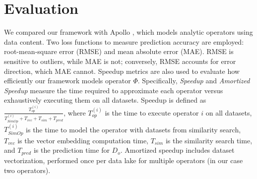 \section{Evaluation}

We compared our framework with Apollo \cite{b7Apollo1, b7Apollo2}, which models analytic operators using data content. Two loss functions to measure prediction accuracy are employed: root-mean-square error (RMSE) and mean absolute error (MAE). RMSE is sensitive to outliers, while MAE is not; conversely, RMSE accounts for error direction, which MAE cannot. Speedup metrics are also used to evaluate how efficiently our framework models operator $\Phi$. Specifically, \textit{Speedup} and \textit{Amortized Speedup} measure the time required to approximate each operator versus exhaustively executing them on all datasets. Speedup is defined as $\frac{T{^{(i)}_{op}}}{T{^{(i)}_{SimOp} + T_{vec} + T_{sim} + T_{pred}}}$, where $T{^{(i)}_{op}}$ is the time to execute operator $i$ on all datasets, $T{^{(i)}_{SimOp}}$ is the time to model the operator with datasets from similarity search, $T_{vec}$ is the vector embedding computation time, $T_{sim}$ is the similarity search time, and $T_{pred}$ is the prediction time for $D_o$. Amortized speedup includes dataset vectorization, performed once per data lake for multiple operators (in our case two operators).

